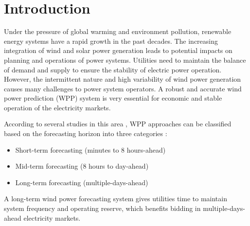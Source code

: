 \documentclass[conference]{IEEEtran}
\begin{document}
%
\IEEEpeerreviewmaketitle



\section{Introduction}
Under the pressure of global warming and environment pollution, renewable energy systems have a rapid growth in the past decades. %
The increasing integration of wind and solar power generation leads to potential impacts on planning and operations of power systems. Utilities need to maintain the balance of demand and supply to ensure the stability of electric power operation. However, the intermittent nature and high variability of wind power generation causes many challenges to power system operators. %
A robust and accurate wind power prediction (WPP) system is very essential for economic and stable operation of the electricity markets.

According to several studies in this area \cite{LAZIC2014567,8489472}, WPP approaches can be classified based on the forecasting horizon into three categories \cite{WANG2011770}:
\begin{itemize}
\item Short-term forecasting (minutes to 8 hours-ahead)
\item Mid-term forecasting (8 hours to day-ahead)
\item Long-term forecasting (multiple-days-ahead)
\end{itemize}
A long-term wind power forecasting system gives utilities time to maintain system frequency and operating reserve, which benefits bidding in multiple-days-ahead electricity markets.
\end{document}
